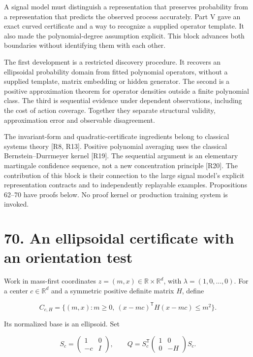 \documentclass[11pt,letterpaper]{article}
\begin{document}
A signal model must distinguish a representation that preserves
probability from a representation that predicts the observed process
accurately. Part V gave an exact curved certificate and a way to
recognize a supplied operator template. It also made the
polynomial-degree assumption explicit. This block advances both
boundaries without identifying them with each other.

The first development is a restricted discovery procedure. It recovers
an ellipsoidal probability domain from fitted polynomial operators,
without a supplied template, matrix embedding or hidden generator. The
second is a positive approximation theorem for operator densities
outside a finite polynomial class. The third is sequential evidence
under dependent observations, including the cost of action coverage.
Together they separate structural validity, approximation error and
observable disagreement.

The invariant-form and quadratic-certificate ingredients belong to
classical systems theory {[}R8, R13{]}. Positive polynomial averaging
uses the classical Bernstein--Durrmeyer kernel {[}R19{]}. The sequential
argument is an elementary martingale confidence sequence, not a new
concentration principle {[}R20{]}. The contribution of this block is
their connection to the large signal model's explicit representation
contracts and to independently replayable examples. Propositions 62--70
have proofs below. No proof kernel or production training system is
invoked.

\section{70. An ellipsoidal certificate with an orientation
test}\label{an-ellipsoidal-certificate-with-an-orientation-test}

Work in mass-first coordinates \(z=(m,x)\in\mathbb R\times\mathbb R^d\),
with \(\lambda=(1,0,\ldots,0)\). For a center \(c\in\mathbb R^d\) and a
symmetric positive definite matrix \(H\), define

\[
C_{c,H}=\{(m,x):m\geq0,\ (x-mc)^{\mathsf T}H(x-mc)\leq m^2\}.
\]

Its normalized base is an ellipsoid. Set

\[
S_c=\begin{pmatrix}1&0\\-c&I\end{pmatrix},\qquad
Q=S_c^{\mathsf T}\begin{pmatrix}1&0\\0&-H\end{pmatrix}S_c.
\]
\end{document}
